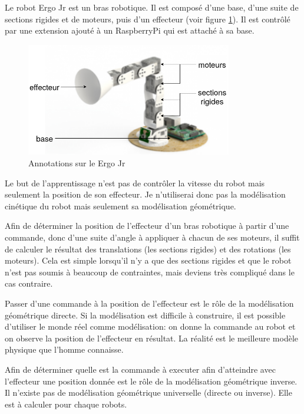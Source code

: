 \documentclass[11pt,french]{report}
\begin{document}
Le robot Ergo Jr est un bras robotique. Il est composé d'une base, d'une suite de sections rigides et de moteurs, puis d'un effecteur (voir figure \ref{fig:SchemaErgoJr}). Il est contrôlé par une extension ajouté à un RaspberryPi qui est attaché à sa base.

\phantom{INVISIBLE LINE}

\begin{figure}[H]
    \centering
    \includegraphics[height=140pt]{Ergo_Diagram} 
    \caption{Annotations sur le Ergo Jr}
    \label{fig:SchemaErgoJr}
\end{figure}

Le but de l'apprentissage n'est pas de contrôler la vitesse du robot mais seulement la position de son effecteur.
Je n'utiliserai donc pas la modélisation cinétique du robot mais seulement sa modélisation géométrique.

\phantom{INVISIBLE LINE}

Afin de déterminer la position de l'effecteur d'un bras robotique à partir d'une commande, donc d'une suite d'angle à appliquer à chacun de ses moteurs, il suffit de calculer le résultat des translations (les sections rigides) et des rotations (les moteurs).
Cela est simple lorsqu'il n'y a que des sections rigides et que le robot n'est pas soumis à beaucoup de contraintes, mais deviens très compliqué dans le cas contraire.

Passer d'une commande à la position de l'effecteur est le rôle de la modélisation géométrique directe.
Si la modélisation est difficile à construire, il est possible d'utiliser le monde réel comme modélisation: on donne la commande au robot et on observe la position de l'effecteur en résultat.
La réalité est le meilleure modèle physique que l'homme connaisse.

\phantom{INVISIBLE LINE}

Afin de déterminer quelle est la commande à executer afin d'atteindre avec l'effecteur une position donnée est le rôle de la modélisation géométrique inverse.
Il n'existe pas de modélisation géométrique universelle (directe ou inverse).
Elle est à calculer pour chaque robots.
\end{document}
